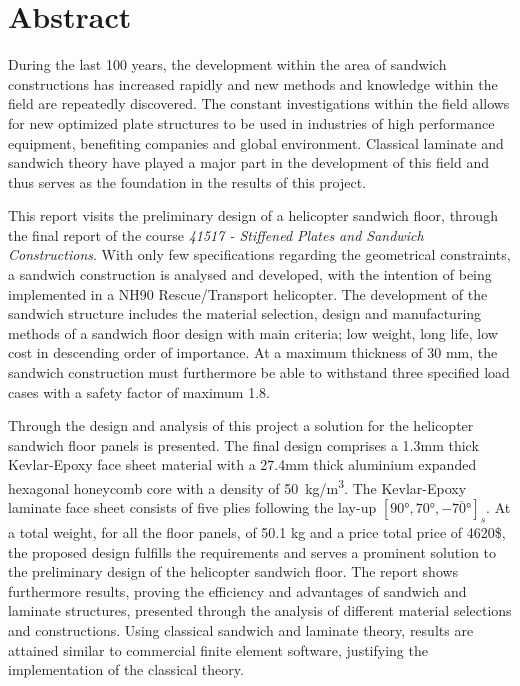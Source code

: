 \section*{Abstract}

During the last 100 years, the development within the area of sandwich constructions has increased rapidly and new methods and knowledge within the field are repeatedly discovered. The constant investigations within the field allows for new optimized plate structures to be used in industries of high performance equipment, benefiting companies and global environment. Classical laminate and sandwich theory have played a major part in the development of this field and thus serves as the foundation in the results of this project.

This report visits the preliminary design of a helicopter sandwich floor, through the final report of the course \textit{41517 - Stiffened Plates and Sandwich Constructions}. With only few specifications regarding the geometrical constraints, a sandwich construction is analysed and developed, with the intention of being implemented in a NH90 Rescue/Transport helicopter. The development of the sandwich structure includes the material selection, design and manufacturing methods of a sandwich floor design with main criteria; low weight, long life, low cost in descending order of importance. At a maximum thickness of 30 mm, the sandwich construction must furthermore be able to withstand three specified load cases with a safety factor of maximum 1.8.

Through the design and analysis of this project a solution for the helicopter sandwich floor panels is presented. The final design comprises a 1.3mm thick Kevlar-Epoxy face sheet material with a 27.4mm thick aluminium expanded hexagonal honeycomb core with a density of \SI{50}{kg/m^3}. The Kevlar-Epoxy laminate face sheet consists of five plies following the lay-up $[90°,70°,-\overline{70°}]_s$. At a total weight, for all the floor panels, of 50.1 kg and a price total price of 4620\$, the proposed design fulfills the requirements and serves a prominent solution to the preliminary design of the helicopter sandwich floor. The report shows furthermore results, proving the efficiency and advantages of sandwich and laminate structures, presented through the analysis of different material selections and constructions. Using classical sandwich and laminate theory, results are attained similar to commercial finite element software, justifying the implementation of the classical theory. 



